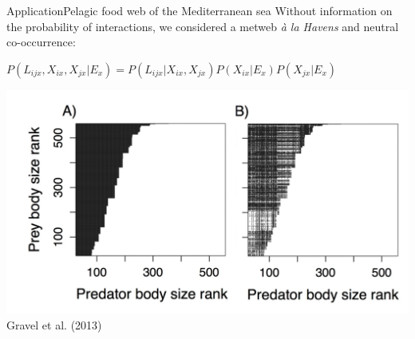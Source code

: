 \documentclass{eecslides}
\begin{document}

	\begin{frame}{Application}{Pelagic food web of the Mediterranean sea}
	Without information on the probability of interactions, we considered a metweb \textit{à la Havens} and neutral co-occurrence:\\	    
		\begin{center}
			$P(L_{ijx},X_{ix},X_{jx}|E_x) = P(L_{ijx}|X_{ix},X_{jx})P(X_{ix}|E_x)P(X_{jx}|E_x)$
		\end{center}
		\begin{center}
			\includegraphics[height=0.5\textheight]{Example_MED}\\
			\footnotesize{Gravel et al. (2013)}
		\end{center}
	\end{frame}

\end{document}
